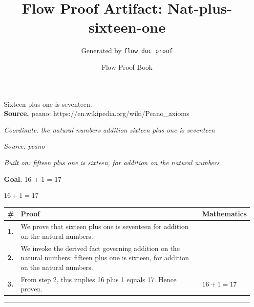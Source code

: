 \documentclass[11pt]{article}
\title{Flow Proof Artifact: Nat-plus-sixteen-one}
\author{Generated by \texttt{flow doc proof}}
\date{Flow Proof Book}
\theoremstyle{definition}
\begin{document}
\maketitle
Sixteen plus one is seventeen.\\[0.5em]
\textbf{Source.} peano: https://en.wikipedia.org/wiki/Peano\_axioms\\[0.5em]
\bigskip
{}\par
\smallskip\noindent\textit{Coordinate: the natural numbers \cdot addition \cdot sixteen plus one is seventeen}\par
\smallskip\noindent\textit{Source: peano}\par
\smallskip\noindent\textit{Built on: fifteen plus one is sixteen, for addition on the natural numbers}\par
\medskip
\noindent\textbf{Goal.} 16 + 1 = 17\par
\noindent$\displaystyle 16 + 1 = 17$\par
\medskip
\noindent
\begin{tabular}{@{} >{\raggedright\arraybackslash}p{} >{\raggedright\arraybackslash}p{} >{\raggedleft\arraybackslash}p{} @{}}
\textbf{\#} & \textbf{Proof} & \textbf{Mathematics} \\
\midrule
\textbf{1.} & We prove that sixteen plus one is seventeen for addition on the natural numbers. & \\[0.45em]
\textbf{2.} & We invoke the derived fact governing addition on the natural numbers: fifteen plus one is sixteen, for addition on the natural numbers. & \\[0.45em]
\textbf{3.} & From step 2, this implies 16 plus 1 equals 17. Hence proven. & $\displaystyle 16 + 1 = 17$ \\[0.45em]
\bottomrule
\end{tabular}
\label{thm:Nat-addition-sixteen_plus_one_is_seventeen}
\par\medskip\hrule
\end{document}
